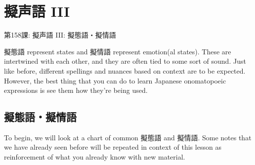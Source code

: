     
\chapter{擬声語 III}

\begin{center}
\begin{Large}
第158課: 擬声語 III: 擬態語・擬情語 
\end{Large}
\end{center}
 
\par{ 擬態語 represent states and 擬情語 represent emotion(al states). These are intertwined with each other, and they are often tied to some sort of sound. Just like before, different spellings and nuances based on context are to be expected. However, the best thing that you can do to learn Japanese onomatopoeic expressions is see them how they're being used. }
      
\section{擬態語・擬情語}
 
\par{ To begin, we will look at a chart of common 擬態語 and 擬情語. Some notes that we have already seen before will be repeated in context of this lesson as reinforcement of what you already know with new material. }


